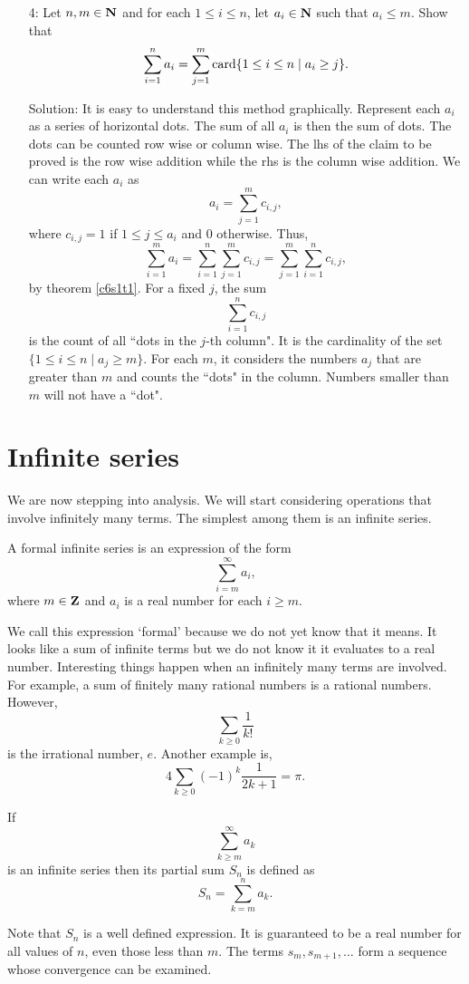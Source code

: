 \begin{enumerate}
\item[4:] Let $n, m \in \mathbf{N}$ and for each $1 \le i \le n$, let $a_i \in 
\mathbf{N}$ such that $a_i \le m$. Show that
\[
\sum_{i=1}^n a_i = \sum_{j=1}^m \operatorname{card}\{1 \le i \le n \;|\; a_i \ge j\}.
\]
\item[Solution:] It is easy to understand this method graphically. 
Represent each $a_i$ as a series of horizontal dots. The sum of all $a_i$
is then the sum of dots. The dots can be counted row wise or column wise.
The lhs of the claim to be proved is the row wise addition while the rhs
is the column wise addition. We can write each $a_i$ as
\[
a_i = \sum_{j = 1}^m c_{i, j},
\]
where $c_{i, j} = 1$ if $1 \le j \le a_i$ and $0$ otherwise. Thus,
\[
\sum_{i=1}^m a_i = \sum_{i=1}^n \sum_{j=1}^m c_{i, j} = 
\sum_{j=1}^m \sum_{i=1}^n c_{i, j},
\]
by theorem \ref{c6s1t1}. For a fixed $j$, the sum
\[
\sum_{i=1}^n c_{i, j}
\]
is the count of all ``dots in the $j$-th column". It is the cardinality
of the set $\{1 \le i \le n \;|\; a_j \ge m\}$. For each $m$, it considers
the numbers $a_j$ that are greater than $m$ and counts the ``dots" in the
column. Numbers smaller than $m$ will not have a ``dot".
\end{enumerate}

\section{Infinite series}\label{c6s2}
We are now stepping into analysis. We will start considering operations
that involve infinitely many terms. The simplest among them is an infinite
series.
\begin{defn}\label{c6s2d1}
A formal infinite series is an expression of the form
\[
\sum_{i=m}^\infty a_i,
\]
where $m \in \mathbf{Z}$ and $a_i$ is a real number for each $i \ge m$.
\end{defn}

We call this expression `formal' because we do not yet know that it means.
It looks like a sum of infinite terms but we do not know it it evaluates
to a real number. Interesting things happen when an infinitely many terms
are involved. For example, a sum of finitely many rational numbers is a
rational numbers. However,
\[
\sum_{k \ge 0}\frac{1}{k!}
\]
is the irrational number, $e$. Another example is,
\[
4\sum_{k \ge 0}(-1)^k\frac{1}{2k+1} = \pi.
\]

\begin{defn}\label{c6s2d2}
If 
\[
\sum_{k \ge m}^\infty a_k
\]
is an infinite series then its partial sum $S_n$ is defined as
\[
S_n = \sum_{k=m}^n a_k.
\]
\end{defn}
Note that $S_n$ is a well defined expression. It is guaranteed to be a
real number for all values of $n$, even those less than $m$. The terms
$s_m, s_{m+1}, \ldots$ form a sequence whose convergence can be examined.


